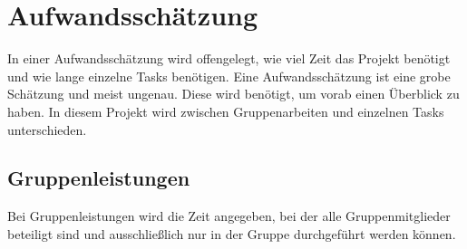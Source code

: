 \newcommand{\trschaetzung}[3]{\rowcolor{lightgray}\textbf{#1} & \textbf{#2} \\* \multicolumn{2}{|l|}{\begin{tabular}[c]{@{}l@{}}#3\end{tabular}} \\ \hline}
\chapter{Aufwandsschätzung}\label{ch:aufwandsschatzung}
In einer Aufwandsschätzung wird offengelegt, wie viel Zeit das Projekt benötigt und wie lange einzelne Tasks benötigen.
Eine Aufwandsschätzung ist eine grobe Schätzung und meist ungenau.
Diese wird benötigt, um vorab einen Überblick zu haben.
In diesem Projekt wird zwischen Gruppenarbeiten und einzelnen Tasks unterschieden. 

\section{Gruppenleistungen}\label{sec:gruppenleistungen}
Bei Gruppenleistungen wird die Zeit angegeben, bei der alle Gruppenmitglieder beteiligt sind
und ausschließlich nur in der Gruppe durchgeführt werden können.

